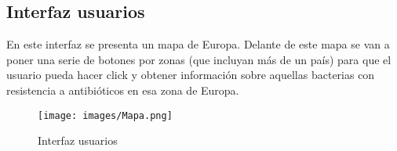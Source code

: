 \documentclass[../main.tex]{subfiles}
\begin{document}
\newpage

\subsection{Interfaz usuarios}

En este interfaz se presenta un mapa de Europa. Delante de este mapa se van a poner una serie de botones por zonas (que incluyan más de un país) para que el usuario pueda hacer click y obtener información sobre aquellas bacterias con resistencia a antibióticos en esa zona de Europa.

\begin{figure}[ht]
    \centering
    \texttt{[image: images/Mapa.png]}
    \caption{Interfaz usuarios}
    \label{Mapalabel}
\end{figure}
\end{document}
